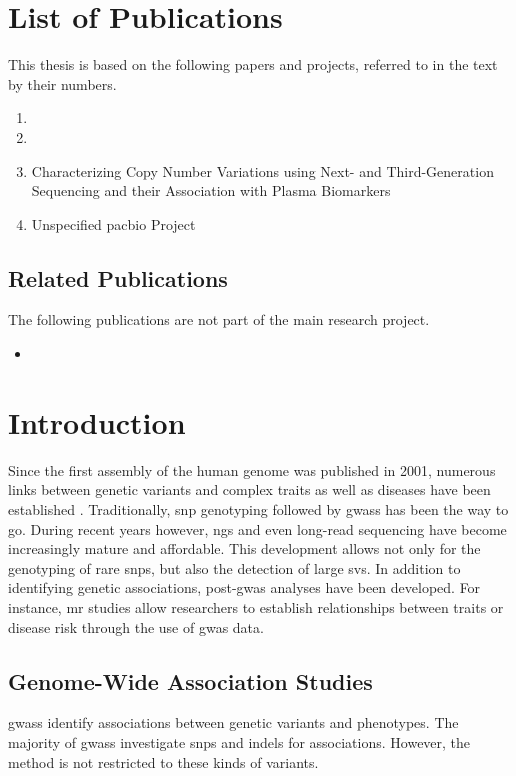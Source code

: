 \documentclass[draft]{scrbook}
\begin{document}
\chapter{List of Publications}
This thesis is based on the following papers and projects, referred to in the text by their numbers.

\begin{enumerate}[label=\Roman*.]
    \item {}
    \item {}
    \item Characterizing Copy Number Variations using Next- and Third-Generation Sequencing and their Association with Plasma Biomarkers
    \item Unspecified \gls{pacbio} Project
\end{enumerate}

\section*{Related Publications}
The following publications are not part of the main research project.
\begin{itemize}
    \item {}
\end{itemize}

\tableofcontents

\mainmatter
\glsresetall
\parskip 0pt
\parindent \oldparindent
\chapter{Introduction}
Since the first assembly of the human genome was published in 2001, numerous links between genetic variants and complex traits as well as diseases have been established \cite{Lander2001}.
Traditionally, \gls{snp} genotyping followed by \glspl{gwas} has been the way to go.
During recent years however, \gls{ngs} and even long-read sequencing have become increasingly mature and affordable.
This development allows not only for the genotyping of rare \glspl{snp}, but also the detection of large \glspl{sv}.
In addition to identifying genetic associations, post-\gls{gwas} analyses have been developed.
For instance, \gls{mr} studies allow researchers to establish relationships between traits or disease risk through the use of \gls{gwas} data.

\section{Genome-Wide Association Studies}
\Glspl{gwas} identify associations between genetic variants and phenotypes.
The majority of \glspl{gwas} investigate \glspl{snp} and \glspl{indel} for associations.
However, the method is not restricted to these kinds of variants.
\end{document}
